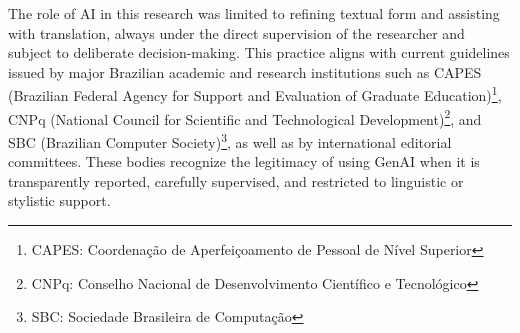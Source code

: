 The role of AI in this research was limited to refining textual form and assisting with translation, always under the direct supervision of the researcher and subject to deliberate decision-making. This practice aligns with current guidelines issued by major Brazilian academic and research institutions such as CAPES (Brazilian Federal Agency for Support and Evaluation of Graduate Education)\footnote{CAPES: Coordenação de Aperfeiçoamento de Pessoal de Nível Superior}, CNPq (National Council for Scientific and Technological Development)\footnote{CNPq: Conselho Nacional de Desenvolvimento Científico e Tecnológico}, and SBC (Brazilian Computer Society)\footnote{SBC: Sociedade Brasileira de Computação}, as well as by international editorial committees. These bodies recognize the legitimacy of using GenAI when it is transparently reported, carefully supervised, and restricted to linguistic or stylistic support.

